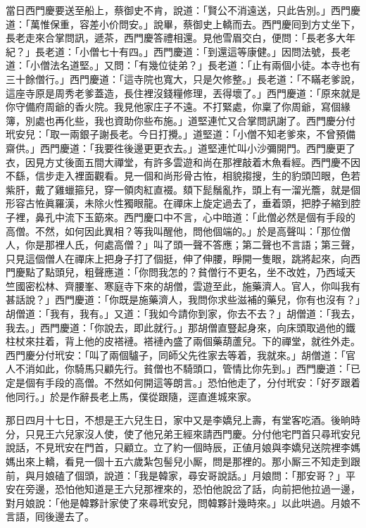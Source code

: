 當日西門慶要送至船上，蔡御史不肯，說道：「賢公不消遠送，只此告別。」西門慶道：「萬惟保重，容差小价問安。」說畢，蔡御史上轎而去。西門慶囘到方丈坐下，長老走來合掌問訊，遞茶，西門慶答禮相還。見他雪眉交白，便問：「長老多大年紀？」長老道：「小僧七十有四。」西門慶道：「到還這等康健。」因問法號，長老道：「小僧法名道堅。」又問：「有幾位徒弟？」長老道：「止有兩個小徒。本寺也有三十餘僧行。」西門慶道：「這寺院也寬大，只是欠修整。」長老道：「不瞞老爹說，這座寺原是周秀老爹蓋造，長住裡沒錢糧修理，丟得壞了。」西門慶道：「原來就是你守備府周爺的香火院。我見他家庄子不遠。不打緊處，你稟了你周爺，寫個緣簿，別處也再化些，我也資助你些布施。」道堅連忙又合掌問訊謝了。西門慶分付玳安兒：「取一兩銀子謝長老。今日打攪。」道堅道：「小僧不知老爹來，不曾預備齋供。」西門慶道：「我要徃後邊更更衣去。」道堅連忙叫小沙彌開門。西門慶更了衣，因見方丈後面五間大禪堂，有許多雲遊和尚在那裡敲着木魚看經。西門慶不因不繇，信步走入裡面觀看。見一個和尚形骨古恠，相貌搊搜，生的豹頭凹眼，色若紫肝，戴了雞蠟箍兒，穿一領肉紅直裰。頦下髭鬚亂拃，頭上有一溜光簷，就是個形容古恠眞羅漢，未除火性獨眼龍。{}在禪床上旋定過去了，垂着頭，把脖子縮到腔子裡，鼻孔中流下玉筯來。西門慶口中不言，心中暗道：「此僧必然是個有手段的高僧。不然，如何因此異相？等我叫醒他，問他個端的。」於是高聲叫：「那位僧人，你是那裡人氏，何處高僧？」叫了頭一聲不答應；第二聲也不言語；第三聲，只見這個僧人在禪床上把身子打了個挺，伸了伸腰，睜開一隻眼，跳將起來，向西門慶點了點頭兒，{}粗聲應道：「你問我怎的？貧僧行不更名，坐不改姓，乃西域天竺國密松林、齊腰峯、寒庭寺下來的胡僧，雲遊至此，施藥濟人。官人，你叫我有甚話說？」西門慶道：「你既是施藥濟人，我問你求些滋補的藥兒，你有也沒有？」胡僧道：「我有，我有。」又道：「我如今請你到家，你去不去？」胡僧道：「我去，我去。」西門慶道：「你說去，即此就行。」那胡僧直豎起身來，向床頭取過他的鐵柱杖來拄着，背上他的皮褡褳。褡褳內盛了兩個藥葫蘆兒。下的禪堂，就徃外走。西門慶分付玳安：「叫了兩個驢子，同師父先徃家去等着，我就來。」胡僧道：「官人不消如此，你騎馬只顧先行。貧僧也不騎頭口，管情比你先到。」西門慶道：「已定是個有手段的高僧。不然如何開這等朗言。」恐怕他走了，分付玳安：「好歹跟着他同行。」於是作辭長老上馬，僕從跟隨，逕直進城來家。

那日四月十七日，不想是王六兒生日，家中又是李嬌兒上壽，有堂客吃酒。後晌時分，只見王六兒家沒人使，使了他兄弟王經來請西門慶。分付他宅門首只尋玳安兒說話，不見玳安在門首，只顧立。立了約一個時辰，正値月娘與李嬌兒送院裡李媽媽出來上轎，看見一個十五六歲紮包髻兒小厮，問是那裡的。那小厮三不知走到跟前，與月娘磕了個頭，說道：「我是韓家，尋安哥說話。」月娘問：「那安哥？」平安在旁邊，恐怕他知道是王六兒那裡來的，恐怕他說岔了話，向前把他拉過一邊，對月娘說：「他是韓夥計家使了來尋玳安兒，問韓夥計幾時來。」以此哄過。月娘不言語，囘後邊去了。

